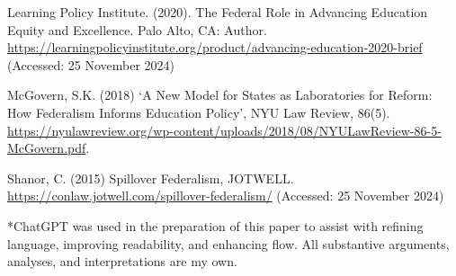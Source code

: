 \documentclass[11pt]{extarticle}
\begin{document}
\par \vspace{0.5cm}
\begin{hangparas}{.25in}{1}
Learning Policy Institute. (2020). The Federal Role in Advancing Education Equity and Excellence. Palo Alto, CA: Author. \url{https://learningpolicyinstitute.org/product/advancing-education-2020-brief} (Accessed: 25 November 2024)
\end{hangparas}
\par \vspace{0.5cm}
\begin{hangparas}{.25in}{1}
McGovern, S.K. (2018) ‘A New Model for States as Laboratories for Reform: How Federalism Informs Education Policy’, NYU Law Review, 86(5). \url{https://nyulawreview.org/wp-content/uploads/2018/08/NYULawReview-86-5-McGovern.pdf}.
\end{hangparas}
\par \vspace{0.5cm}
\begin{hangparas}{.25in}{1}
Shanor, C. (2015) Spillover Federalism, JOTWELL. \url{https://conlaw.jotwell.com/spillover-federalism/} (Accessed: 25 November 2024)
\end{hangparas}
\par \vspace{7.5cm}
*ChatGPT was used in the preparation of this paper to assist with refining language, improving readability, and enhancing flow. All substantive arguments, analyses, and interpretations are my own.
\end{document}
